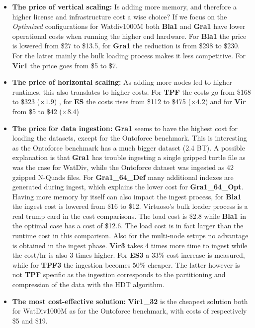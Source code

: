 \begin{itemize}
	\item \textbf{The price of vertical scaling:} Is adding more memory, and therefore a higher license and infrastructure cost a wise choice? If we focus on the \emph{Optimized} configurations for Watdiv1000M both \textbf{Bla1} and \textbf{Gra1} have lower operational costs when running the higher end hardware. For \textbf{Bla1} the price is lowered from \$27 to \$13.5, for \textbf{Gra1} the reduction is from \$298 to \$230. For the latter mainly the bulk loading process makes it less competitive. For \textbf{Vir1} the price goes from \$5 to \$7.
	
	\item \textbf{The price of horizontal scaling:} As adding more nodes led to higher runtimes, this also translates to higher costs. For \textbf{TPF} the costs go from \$168 to \$323 ($\times 1.9$) , for \textbf{ES} the costs rises from \$112 to \$475 ($\times 4.2$) and for \textbf{Vir} from \$5 to \$42 ($\times 8.4$) 

	\item \textbf{The price for data ingestion:} \textbf{Gra1} seems to have the highest cost for loading the datasets, except for the Ontoforce benchmark. This is interesting as the Ontoforce benchmark has a much bigger dataset (2.4 BT). A possible explanation is that \textbf{Gra1} has trouble ingesting a single gzipped turtle file as was the case for WatDiv, while the Ontoforce dataset was ingested as 42 gzipped N-Quads files.
    For \textbf{Gra1\_64\_Def} many additional indexes are generated during ingest, which explains the lower cost for \textbf{Gra1\_64\_Opt}. Having more memory by itself can also impact the ingest process, for \textbf{Bla1} the ingest cost is lowered from \$16 to \$12. Virtuoso's bulk loader process is a real trump 
    card in the cost comparisons. The load cost is \$2.8 while \textbf{Bla1} in the optimal case has a cost of \$12.6. The load cost is in fact larger than the runtime cost in this comparison.
    Also for the multi-node setups no advantage is obtained in the ingest phase. \textbf{Vir3} takes 4 times more time to ingest while the cost/hr is also 3 times higher. For \textbf{ES3} a 33\% cost increase is measured, while for \textbf{TPF3} the ingestion becomes 50\% cheaper. The latter however is not \textbf{TPF} specific as the ingestion corresponds to the partitioning and compression of the data with the HDT algorithm.

	\item \textbf{The most cost-effective solution:} \textbf{Vir1\_32} is the cheapest solution both for WatDiv1000M as for the Ontoforce benchmark, with costs of respectively \$5 and  \$19. 
\end{itemize}
